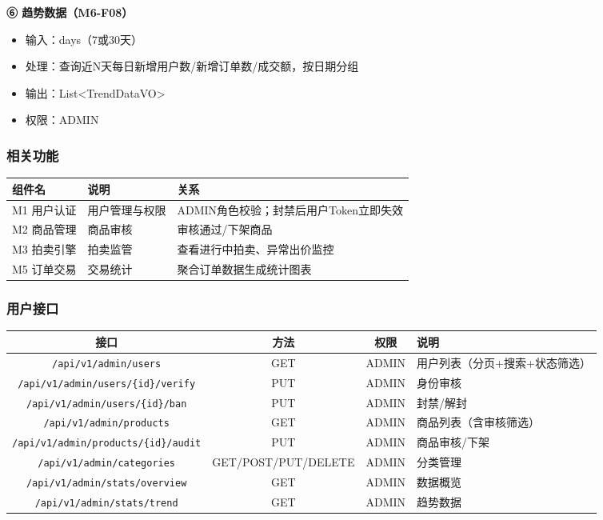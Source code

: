 \documentclass[12pt,a4paper]{ctexart}
\numberwithin{figure}{section}
\numberwithin{table}{section}
\begin{document}
\textbf{⑥ 趋势数据（M6-F08）}

\begin{itemize}
    \item 输入：days（7或30天）
    \item 处理：查询近N天每日新增用户数/新增订单数/成交额，按日期分组
    \item 输出：List<TrendDataVO>
    \item 权限：ADMIN
\end{itemize}

\subsubsection{相关功能}

\begin{center}
\renewcommand{\arraystretch}{1.3}
\begin{tabular}{|p{3cm}|p{4cm}|p{7cm}|}
\hline
\rowcolor{tableheader}
\textbf{组件名} & \textbf{说明} & \textbf{关系} \\
\hline
M1 用户认证 & 用户管理与权限 & ADMIN角色校验；封禁后用户Token立即失效 \\
\hline
M2 商品管理 & 商品审核 & 审核通过/下架商品 \\
\hline
M3 拍卖引擎 & 拍卖监管 & 查看进行中拍卖、异常出价监控 \\
\hline
M5 订单交易 & 交易统计 & 聚合订单数据生成统计图表 \\
\hline
\end{tabular}
\end{center}

\subsubsection{用户接口}

\begin{center}
\renewcommand{\arraystretch}{1.3}
\small
\begin{tabular}{|c|c|c|p{5cm}|}
\hline
\rowcolor{tableheader}
\textbf{接口} & \textbf{方法} & \textbf{权限} & \textbf{说明} \\
\hline
\verb|/api/v1/admin/users| & GET & ADMIN & 用户列表（分页+搜索+状态筛选） \\
\hline
\verb|/api/v1/admin/users/{id}/verify| & PUT & ADMIN & 身份审核 \\
\hline
\verb|/api/v1/admin/users/{id}/ban| & PUT & ADMIN & 封禁/解封 \\
\hline
\verb|/api/v1/admin/products| & GET & ADMIN & 商品列表（含审核筛选） \\
\hline
\verb|/api/v1/admin/products/{id}/audit| & PUT & ADMIN & 商品审核/下架 \\
\hline
\verb|/api/v1/admin/categories| & GET/POST/PUT/DELETE & ADMIN & 分类管理 \\
\hline
\verb|/api/v1/admin/stats/overview| & GET & ADMIN & 数据概览 \\
\hline
\verb|/api/v1/admin/stats/trend| & GET & ADMIN & 趋势数据 \\
\hline
\end{tabular}
\end{center}
\end{document}
